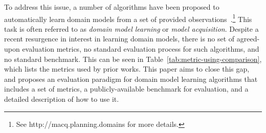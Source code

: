\documentclass{article}
\theoremstyle{definition}
\theoremstyle{remark}
\newif\ifaddcomments
\newcommand{\roni}[1]{\ifaddcomments{\textcolor{red}{[Roni: #1]}}\fi}
\newcommand{\yarin}[1]{\ifaddcomments{\textcolor{teal}{[Yarin: #1]}}\fi}
\newcommand{\cm}[1]{\ifaddcomments{\textcolor{olive}{[Christian: #1]}}\fi}
\begin{document}
To address this issue, a number of algorithms have been proposed to automatically learn domain models from a set of provided observations~\citep{macq,aineto2019learning,jimenez2012review}.\footnote{See http://macq.planning.domains for more details.} 
This task is often referred to as \emph{domain model learning} or \emph{model acquisition}. %
Despite a recent resurgence in interest in learning domain models, there is 
no set of agreed-upon evaluation metrics, 
no standard evaluation process for such algorithms, 
and no standard benchmark. This can be seen in Table~\ref{tab:metric-using-comparison}, which lists the metrics used by prior works. 
This paper aims to close this gap, and proposes an evaluation paradigm for domain model learning algorithms that includes a set of metrics, a publicly-available benchmark for evaluation, and a detailed description of how to use it. 
\end{document}
